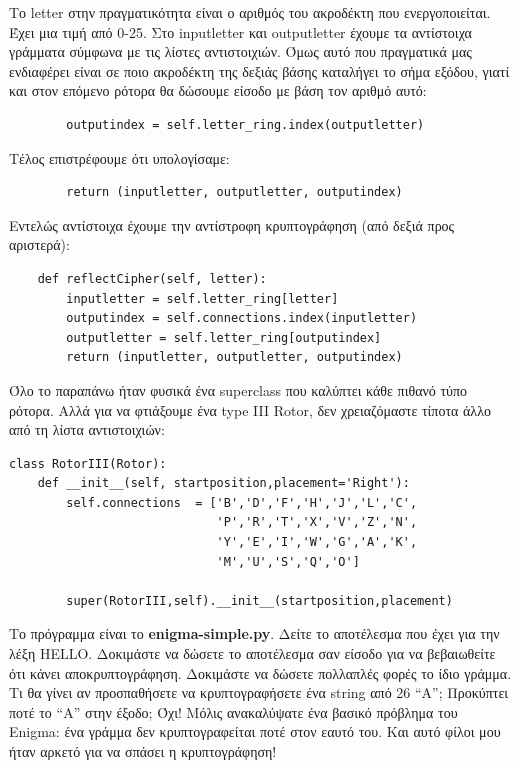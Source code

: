 \documentclass[a4paper,twoside,12pt]{article}
\begin{document}
Το letter στην πραγματικότητα είναι ο αριθμός του ακροδέκτη που ενεργοποιείται. Έχει μια τιμή από 0-25. Στο inputletter και outputletter έχουμε τα αντίστοιχα γράμματα σύμφωνα με τις λίστες αντιστοιχιών. Όμως αυτό που πραγματικά μας ενδιαφέρει είναι σε ποιο ακροδέκτη της δεξιάς βάσης καταλήγει το σήμα εξόδου, γιατί και στον επόμενο ρότορα θα δώσουμε είσοδο με βάση τον αριθμό αυτό:

\begin{verbatim}
        outputindex = self.letter_ring.index(outputletter)
\end{verbatim}

Τέλος επιστρέφουμε ότι υπολογίσαμε:

\begin{verbatim}
        return (inputletter, outputletter, outputindex)
\end{verbatim}

Εντελώς αντίστοιχα έχουμε την αντίστροφη κρυπτογράφηση (από δεξιά προς αριστερά):

\begin{verbatim}
    def reflectCipher(self, letter):
        inputletter = self.letter_ring[letter]
        outputindex = self.connections.index(inputletter)
        outputletter = self.letter_ring[outputindex]
        return (inputletter, outputletter, outputindex)
\end{verbatim}

Όλο το παραπάνω ήταν φυσικά ένα superclass που καλύπτει κάθε πιθανό τύπο ρότορα. Αλλά για να φτιάξουμε ένα type III Rotor, δεν χρειαζόμαστε τίποτα άλλο από τη λίστα αντιστοιχιών:

\begin{verbatim}
class RotorIII(Rotor):
    def __init__(self, startposition,placement='Right'):
        self.connections  = ['B','D','F','H','J','L','C',
                             'P','R','T','X','V','Z','N',
                             'Y','E','I','W','G','A','K',
                             'M','U','S','Q','O']

        super(RotorIII,self).__init__(startposition,placement)
\end{verbatim}

Το πρόγραμμα είναι το \textbf{enigma-simple.py}. Δείτε το αποτέλεσμα που έχει για την λέξη HELLO. Δοκιμάστε να δώσετε το αποτέλεσμα σαν είσοδο για να βεβαιωθείτε ότι κάνει αποκρυπτογράφηση. Δοκιμάστε να δώσετε πολλαπλές φορές το ίδιο γράμμα. Τι θα γίνει αν προσπαθήσετε να κρυπτογραφήσετε ένα string από 26 “Α”; Προκύπτει ποτέ το “Α” στην έξοδο; Όχι! Μόλις ανακαλύψατε ένα βασικό πρόβλημα του Enigma: ένα γράμμα δεν κρυπτογραφείται ποτέ στον εαυτό του. Και αυτό φίλοι μου ήταν αρκετό για να σπάσει η κρυπτογράφηση!
\end{document}
